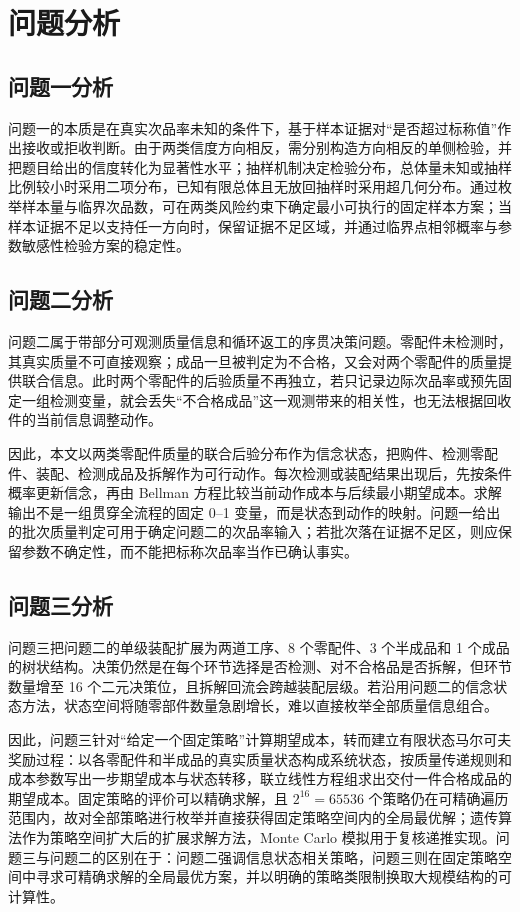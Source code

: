 \section{问题分析}

\subsection{问题一分析}

问题一的本质是在真实次品率未知的条件下，基于样本证据对“是否超过标称值”作出接收或拒收判断。由于两类信度方向相反，需分别构造方向相反的单侧检验，并把题目给出的信度转化为显著性水平；抽样机制决定检验分布，总体量未知或抽样比例较小时采用二项分布，已知有限总体且无放回抽样时采用超几何分布。通过枚举样本量与临界次品数，可在两类风险约束下确定最小可执行的固定样本方案；当样本证据不足以支持任一方向时，保留证据不足区域，并通过临界点相邻概率与参数敏感性检验方案的稳定性。

\subsection{问题二分析}

问题二属于带部分可观测质量信息和循环返工的序贯决策问题。零配件未检测时，其真实质量不可直接观察；成品一旦被判定为不合格，又会对两个零配件的质量提供联合信息。此时两个零配件的后验质量不再独立，若只记录边际次品率或预先固定一组检测变量，就会丢失“不合格成品”这一观测带来的相关性，也无法根据回收件的当前信息调整动作。

因此，本文以两类零配件质量的联合后验分布作为信念状态，把购件、检测零配件、装配、检测成品及拆解作为可行动作。每次检测或装配结果出现后，先按条件概率更新信念，再由 Bellman 方程比较当前动作成本与后续最小期望成本。求解输出不是一组贯穿全流程的固定 0--1 变量，而是状态到动作的映射。问题一给出的批次质量判定可用于确定问题二的次品率输入；若批次落在证据不足区，则应保留参数不确定性，而不能把标称次品率当作已确认事实。

\subsection{问题三分析}

问题三把问题二的单级装配扩展为两道工序、8 个零配件、3 个半成品和 1 个成品的树状结构。决策仍然是在每个环节选择是否检测、对不合格品是否拆解，但环节数量增至 16 个二元决策位，且拆解回流会跨越装配层级。若沿用问题二的信念状态方法，状态空间将随零部件数量急剧增长，难以直接枚举全部质量信息组合。

因此，问题三针对“给定一个固定策略”计算期望成本，转而建立有限状态马尔可夫奖励过程：以各零配件和半成品的真实质量状态构成系统状态，按质量传递规则和成本参数写出一步期望成本与状态转移，联立线性方程组求出交付一件合格成品的期望成本。固定策略的评价可以精确求解，且 $2^{16}=65536$ 个策略仍在可精确遍历范围内，故对全部策略进行枚举并直接获得固定策略空间内的全局最优解；遗传算法作为策略空间扩大后的扩展求解方法，Monte Carlo 模拟用于复核递推实现。问题三与问题二的区别在于：问题二强调信息状态相关策略，问题三则在固定策略空间中寻求可精确求解的全局最优方案，并以明确的策略类限制换取大规模结构的可计算性。

